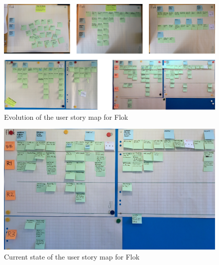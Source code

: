 \documentclass[a4paper,12pt, oneside]{article}
\begin{document}
\begin{figure}[!htb]
    \centering
    \includegraphics[width=\textwidth]{images/flokUsmEvolution.png}
    \caption{Evolution of the user story map for Flok}
    \label{fig.flokUsmEvolution}
\end{figure}

\begin{figure}[!htb]
    \centering
    \includegraphics[width=\textwidth]{images/flokUsmCurrent.jpg}
    \caption{Current state of the user story map for Flok}
    \label{fig.flokUsmCurrent}
\end{figure}

\FloatBarrier
\end{document}
